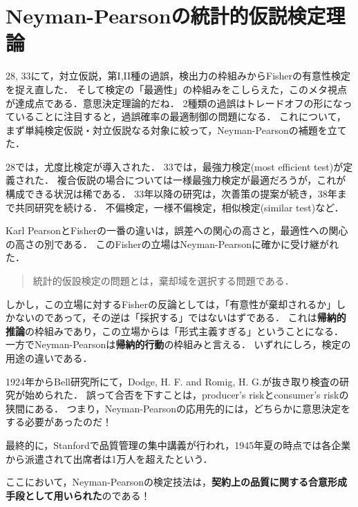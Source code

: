 \documentclass[uplatex,dvipdfmx]{jsreport}
\begin{document}
\section{Neyman-Pearsonの統計的仮説検定理論}

\begin{tcolorbox}[colframe=ForestGreen, colback=ForestGreen!10!white,breakable,colbacktitle=ForestGreen!40!white,coltitle=black,fonttitle=\bfseries\sffamily,
title=]
    28, 33にて，対立仮説，第I,II種の過誤，検出力の枠組みからFisherの有意性検定を捉え直した．
    そして検定の「最適性」の枠組みをこしらえた，このメタ視点が達成点である．意思決定理論的だね．
    2種類の過誤はトレードオフの形になっていることに注目すると，過誤確率の最適制御の問題になる．
    これについて，まず単純検定仮説・対立仮説なる対象に絞って，Neyman-Pearsonの補題を立てた．
\end{tcolorbox}

\begin{history}
    28\cite{NeymanPearson28}では，尤度比検定が導入された．
    33\cite{NeymanPearson33}では，最強力検定(most efficient test)が定義された．
    複合仮説の場合については一様最強力検定が最適だろうが，これが構成できる状況は稀である．
    33年以降の研究は，次善策の提案が続き，38年まで共同研究を続ける．
    不偏検定，一様不偏検定，相似検定(similar test)など．

    Karl PearsonとFisherの一番の違いは，誤差への関心の高さと，最適性への関心の高さの別である．
    このFisherの立場はNeyman-Pearsonに確かに受け継がれた．
    \begin{quote}
        統計的仮設検定の問題とは，棄却域を選択する問題である．
    \end{quote}
    しかし，この立場に対するFisherの反論としては，「有意性が棄却されるか」しかないのであって，その逆は「採択する」ではないはずである．
    これは\textbf{帰納的推論}の枠組みであり，この立場からは「形式主義すぎる」ということになる．
    一方でNeyman-Pearsonは\textbf{帰納的行動}の枠組みと言える．
    いずれにしろ，検定の用途の違いである．
\end{history}

\begin{context}
    1924年からBell研究所にて，Dodge, H. F. and Romig, H. G.が抜き取り検査の研究が始められた．
    誤って合否を下すことは，producer's riskとconsumer's riskの狭間にある．
    つまり，Neyman-Pearsonの応用先的には，どちらかに意思決定をする必要があったのだ！

    最終的に，Stanfordで品質管理の集中講義が行われ，1945年夏の時点では各企業から派遣されて出席者は1万人を超えたという．
    
    ここにおいて，Neyman-Pearsonの検定技法は，\textbf{契約上の品質に関する合意形成手段として用いられた}のである！
\end{context}
\end{document}
